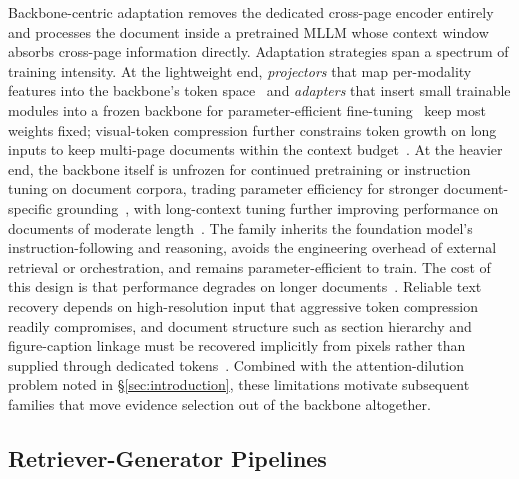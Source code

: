 \documentclass[11pt]{article}
\begin{document}
Backbone-centric adaptation removes the dedicated cross-page encoder entirely and processes the document inside a pretrained MLLM whose context window absorbs cross-page information directly. Adaptation strategies span a spectrum of training intensity. At the lightweight end, \emph{projectors} that map per-modality features into the backbone's token space~\cite{tanaka2024instructdoc} and \emph{adapters} that insert small trainable modules into a frozen backbone for parameter-efficient fine-tuning~\cite{zhu2025laytokenllm} keep most weights fixed; visual-token compression further constrains token growth on long inputs to keep multi-page documents within the context budget~\cite{hu2025mplugdocowl2}. At the heavier end, the backbone itself is unfrozen for continued pretraining or instruction tuning on document corpora, trading parameter efficiency for stronger document-specific grounding~\cite{duan2025docopilot}, with long-context tuning further improving performance on documents of moderate length~\cite{hu2024mplugdocowl,yu2024texthawk2}. The family inherits the foundation model's instruction-following and reasoning, avoids the engineering overhead of external retrieval or orchestration, and remains parameter-efficient to train. The cost of this design is that performance degrades on longer documents~\cite{jia2024leopard}. Reliable text recovery depends on high-resolution input that aggressive token compression readily compromises, and document structure such as section hierarchy and figure-caption linkage must be recovered implicitly from pixels rather than supplied through dedicated tokens~\cite{hannan2025docslm,duan2025docopilot}. Combined with the attention-dilution problem noted in \S\ref{sec:introduction}, these limitations motivate subsequent families that move evidence selection out of the backbone altogether.

\subsection{Retriever-Generator Pipelines}
\label{sec:arch-rg}
\end{document}
